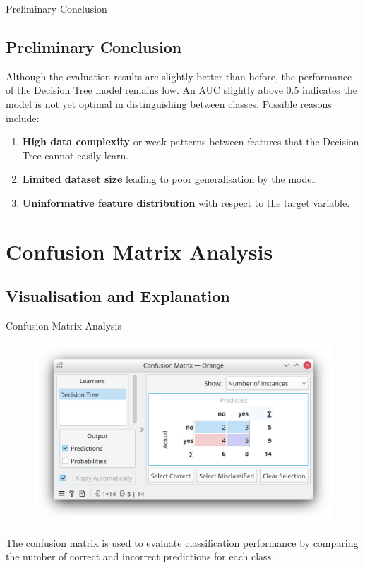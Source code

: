 \documentclass[aspectratio=169, table]{beamer}
\begin{document}
\begin{frame}{Preliminary Conclusion}
	\vspace{5pt}
	\subsection*{Preliminary Conclusion}
	
	Although the evaluation results are slightly better than before, the performance of the Decision Tree model remains low. An AUC slightly above 0.5 indicates the model is not yet optimal in distinguishing between classes. Possible reasons include:
	
	\begin{enumerate}
		\item \textbf{High data complexity} or weak patterns between features that the Decision Tree cannot easily learn.
		\item \textbf{Limited dataset size} leading to poor generalisation by the model.
		\item \textbf{Uninformative feature distribution} with respect to the target variable.
	\end{enumerate}
\end{frame}

\section{Confusion Matrix Analysis}

\subsection*{Visualisation and Explanation}

\begin{frame}{Confusion Matrix Analysis}
	\vspace{5pt}
	\begin{figure}
		\centering
		\includegraphics[width=0.7\linewidth]{../../figures/decision_tree_confusion_matrix.png}
	\end{figure}
	
	\vspace{-20pt}
	The confusion matrix is used to evaluate classification performance by comparing the number of correct and incorrect predictions for each class.
\end{frame}
\end{document}

